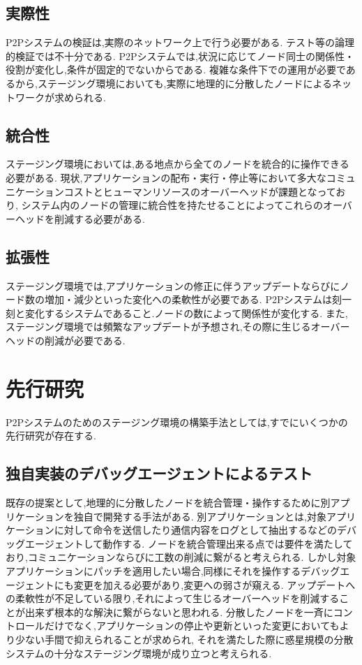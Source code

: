 {\subsection{実際性}
\label{issue:requirements1}

P2Pシステムの検証は,実際のネットワーク上で行う必要がある.
テスト等の論理的検証では不十分である.
P2Pシステムでは,状況に応じてノード同士の関係性・役割が変化し,条件が固定的でないからである.
複雑な条件下での運用が必要であるから,ステージング環境においても,実際に地理的に分散したノードによるネットワークが求められる.

\subsection{統合性}
\label{issue:requirements2}

ステージング環境においては,ある地点から全てのノードを統合的に操作できる必要がある.
現状,アプリケーションの配布・実行・停止等において多大なコミュニケーションコストとヒューマンリソースのオーバーヘッドが課題となっており,
システム内のノードの管理に統合性を持たせることによってこれらのオーバーヘッドを削減する必要がある.

\subsection{拡張性}
\label{issue:requirements3}

ステージング環境では,アプリケーションの修正に伴うアップデートならびにノード数の増加・減少といった変化への柔軟性が必要である.
P2Pシステムは刻一刻と変化するシステムであること.ノードの数によって関係性が変化する.
また,ステージング環境では頻繁なアップデートが予想され,その際に生じるオーバーヘッドの削減が必要である.

\section{先行研究}
\label{issue:previous-research}

P2Pシステムのためのステージング環境の構築手法としては,すでにいくつかの先行研究が存在する.

\subsection{独自実装のデバッグエージェントによるテスト}

既存の提案として,地理的に分散したノードを統合管理・操作するために別アプリケーションを独自で開発する手法がある.
別アプリケーションとは,対象アプリケーションに対して命令を送信したり通信内容をログとして抽出するなどのデバッグエージェントして動作する.
ノードを統合管理出来る点では要件を満たしており,コミュニケーションならびに工数の削減に繋がると考えられる.
しかし対象アプリケーションにパッチを適用したい場合,同様にそれを操作するデバッグエージェントにも変更を加える必要があり,変更への弱さが窺える.
アップデートへの柔軟性が不足している限り,それによって生じるオーバーヘッドを削減することが出来ず根本的な解決に繋がらないと思われる.
分散したノードを一斉にコントロールだけでなく,アプリケーションの停止や更新といった変更においてもより少ない手間で抑えられることが求められ,
それを満たした際に惑星規模の分散システムの十分なステージング環境が成り立つと考えられる.

}
